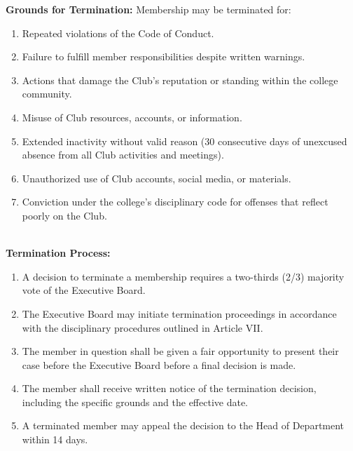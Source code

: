 
\textbf{Grounds for Termination:}
Membership may be terminated for:
\begin{enumerate}[label=\alph*), leftmargin=2em, itemsep=0.3em]
    \item Repeated violations of the Code of Conduct.
    \item Failure to fulfill member responsibilities despite written warnings.
    \item Actions that damage the Club's reputation or standing within the college community.
    \item Misuse of Club resources, accounts, or information.
    \item Extended inactivity without valid reason (30 consecutive days of unexcused absence from all Club activities and meetings).
    \item Unauthorized use of Club accounts, social media, or materials.
    \item Conviction under the college's disciplinary code for offenses that reflect poorly on the Club.
\end{enumerate}
\\
\textbf{Termination Process:}
\begin{enumerate}[label=\alph*), leftmargin=2em, itemsep=0.3em]
    \item A decision to terminate a membership requires a two-thirds (2/3) majority vote of the Executive Board.
    \item The Executive Board may initiate termination proceedings in accordance with the disciplinary procedures outlined in Article VII.
    \item The member in question shall be given a fair opportunity to present their case before the Executive Board before a final decision is made.
    \item The member shall receive written notice of the termination decision, including the specific grounds and the effective date.
    \item A terminated member may appeal the decision to the Head of Department within 14 days.
\end{enumerate}


